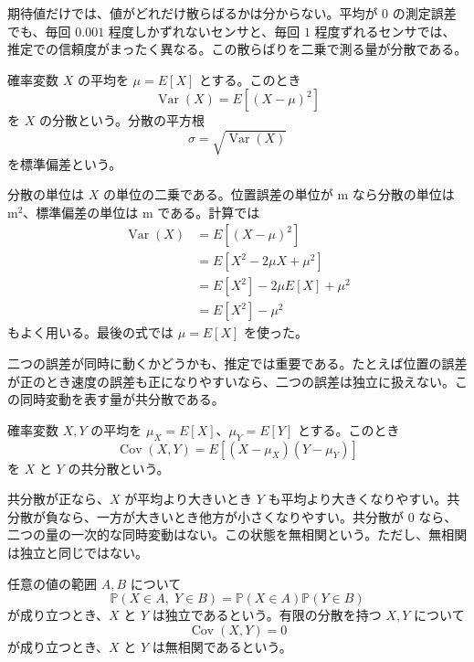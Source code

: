 期待値だけでは、値がどれだけ散らばるかは分からない。平均が 0 の測定誤差でも、毎回 $0.001$ 程度しかずれないセンサと、毎回 $1$ 程度ずれるセンサでは、推定での信頼度がまったく異なる。この散らばりを二乗で測る量が分散である。

\begin{definition}[分散と標準偏差]
確率変数 $X$ の平均を $\mu=E[X]$ とする。このとき
\begin{equation}
  \operatorname{Var}(X)=E[(X-\mu)^2]
\end{equation}
を $X$ の分散という。分散の平方根
\begin{equation}
  \sigma=\sqrt{\operatorname{Var}(X)}
\end{equation}
を標準偏差という。
\end{definition}

分散の単位は $X$ の単位の二乗である。位置誤差の単位が m なら分散の単位は $\mathrm{m^2}$、標準偏差の単位は m である。計算では
\begin{align}
  \operatorname{Var}(X)
  &=E[(X-\mu)^2]\\
  &=E[X^2-2\mu X+\mu^2]\\
  &=E[X^2]-2\mu E[X]+\mu^2\\
  &=E[X^2]-\mu^2
\end{align}
もよく用いる。最後の式では $\mu=E[X]$ を使った。

二つの誤差が同時に動くかどうかも、推定では重要である。たとえば位置の誤差が正のとき速度の誤差も正になりやすいなら、二つの誤差は独立に扱えない。この同時変動を表す量が共分散である。

\begin{definition}[共分散]
確率変数 $X,Y$ の平均を $\mu_X=E[X]$、$\mu_Y=E[Y]$ とする。このとき
\begin{equation}
  \operatorname{Cov}(X,Y)
  =E[(X-\mu_X)(Y-\mu_Y)]
\end{equation}
を $X$ と $Y$ の共分散という。
\end{definition}

共分散が正なら、$X$ が平均より大きいとき $Y$ も平均より大きくなりやすい。共分散が負なら、一方が大きいとき他方が小さくなりやすい。共分散が 0 なら、二つの量の一次的な同時変動はない。この状態を無相関という。ただし、無相関は独立と同じではない。

\begin{definition}[独立と無相関]
任意の値の範囲 $A,B$ について
\begin{equation}
  \mathbb{P}(X\in A,\;Y\in B)
  =\mathbb{P}(X\in A)\mathbb{P}(Y\in B)
\end{equation}
が成り立つとき、$X$ と $Y$ は独立であるという。有限の分散を持つ $X,Y$ について
\begin{equation}
  \operatorname{Cov}(X,Y)=0
\end{equation}
が成り立つとき、$X$ と $Y$ は無相関であるという。
\end{definition}

